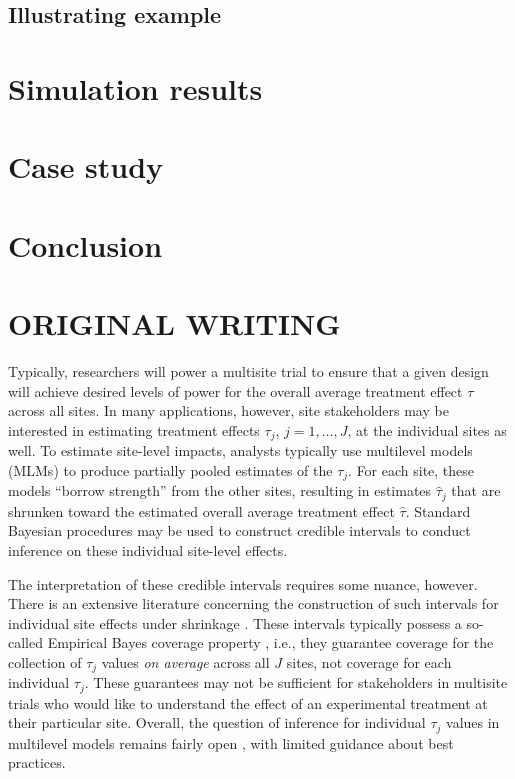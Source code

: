 \documentclass[]{article}
\begin{document}
\subsection{Illustrating example}

\section{Simulation results}

\section{Case study}

\section{Conclusion}



\section{ORIGINAL WRITING}

Typically, researchers will power a multisite trial to ensure that a given design will achieve desired levels of power for the overall average treatment effect $\tau$ across all sites. 
In many applications, however, site stakeholders may be interested in estimating treatment effects $\tau_j$, $j = 1, \ldots, J$, at the individual sites as well.
To estimate site-level impacts, analysts typically use multilevel models (MLMs) to produce partially pooled estimates of the $\tau_j$.
For each site, these models ``borrow strength'' from the other sites, resulting in estimates $\hat{\tau}_j$ that are shrunken toward the estimated overall average treatment effect $\hat{\tau}$.
Standard Bayesian procedures may be used to construct credible intervals to conduct inference on these individual site-level effects.

The interpretation of these credible intervals requires some nuance, however.
There is an extensive literature concerning the construction of such intervals for individual site effects under shrinkage \citep{casella2012shrinkage}.
These intervals typically possess a so-called Empirical Bayes coverage property \citep{morris1983parametric}, i.e., they guarantee coverage for the collection of $\tau_j$ values \textit{on average} across all $J$ sites, not coverage for each individual $\tau_j$.
These guarantees may not be sufficient for stakeholders in multisite trials who would like to understand the effect of an experimental treatment at their particular site.
Overall, the question of inference for individual $\tau_j$ values in multilevel models remains fairly open \citep{armstrong2020robust}, with limited guidance about best practices.
\end{document}

